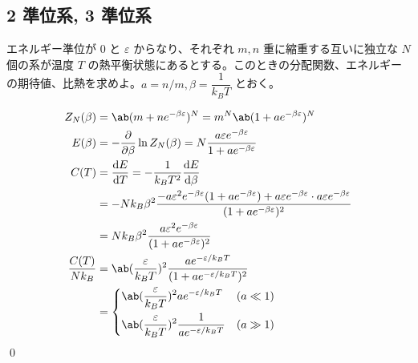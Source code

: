 \documentclass[uplatex,dvipdfmx,a4paper,11pt]{jlreq}
\makeatletter
\theoremstyle{definition}
\renewenvironment{proof}[1][\proofname]{\par
  \normalfont
  \topsep6\p@\@plus6\p@ \trivlist
  \item[\hskip\labelsep{\bfseries #1}\@addpunct{\bfseries}]\ignorespaces\quad\par
}{%
  \qed\endtrivlist\@endpefalse
}
\renewcommand\proofname{証明}
\makeatother
\begin{document}
\subsection{2 準位系, 3 準位系}

\begin{problem}
エネルギー準位が $0$ と $\varepsilon$ からなり、それぞれ $m, n$ 重に縮重する互いに独立な $N$ 個の系が温度 $T$ の熱平衡状態にあるとする。このときの分配関数、エネルギーの期待値、比熱を求めよ。$a = n/m, \beta = \dfrac{1}{k_BT}$ とおく。
\end{problem}
\begin{proof}
  \begin{align}
    Z_N(\beta)        & = \ab(m + ne^{-\beta \varepsilon})^N = m^N\ab(1 + ae^{-\beta \varepsilon})^N                                                                                                                         \\
    E(\beta)          & = -\diffp{}{\beta}\ln Z_N(\beta) = N\frac{a\varepsilon e^{-\beta \varepsilon}}{1 + ae^{-\beta \varepsilon}}                                                                                          \\
    C(T)              & = \diff{E}{T} = -\frac{1}{k_BT^2}\diff{E}{\beta}                                                                                                                                                     \\
                      & = -Nk_B\beta^2\frac{-a\varepsilon^2 e^{-\beta\varepsilon}(1 + ae^{-\beta \varepsilon}) + a\varepsilon e^{-\beta\varepsilon}\cdot a\varepsilon e^{-\beta\varepsilon}}{(1 + ae^{-\beta\varepsilon})^2} \\
                      & = Nk_B\beta^2\frac{a\varepsilon^2 e^{-\beta\varepsilon}}{(1 + ae^{-\beta\varepsilon})^2}                                                                                                             \\
    \frac{C(T)}{Nk_B} & = \ab(\frac{\varepsilon}{k_BT})^2\frac{ae^{-\varepsilon/k_BT}}{(1 + ae^{-\varepsilon/k_BT})^2}                                                                                                       \\
                      & = \begin{dcases}
                            \ab(\frac{\varepsilon}{k_BT})^2 ae^{-\varepsilon/k_BT}          & (a \ll 1) \\
                            \ab(\frac{\varepsilon}{k_BT})^2\frac{1}{ae^{-\varepsilon/k_BT}} & (a \gg 1)
                          \end{dcases}
  \end{align}
\end{proof}
\end{document}
